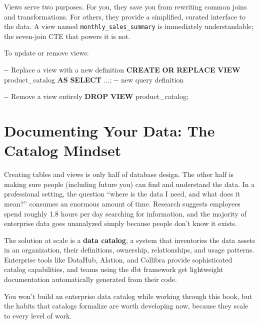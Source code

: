 \documentclass[
  letterpaper,
  DIV=11,
  numbers=noendperiod]{scrreprt}
\newenvironment{Shaded}{\begin{snugshade}}{\end{snugshade}}
\newcommand{\CommentTok}[1]{\textcolor[rgb]{0.37,0.37,0.37}{#1}}
\newcommand{\KeywordTok}[1]{\textcolor[rgb]{0.00,0.23,0.31}{\textbf{#1}}}
\newcommand{\NormalTok}[1]{\textcolor[rgb]{0.00,0.23,0.31}{#1}}
\newcommand{\OperatorTok}[1]{\textcolor[rgb]{0.37,0.37,0.37}{#1}}
\begin{document}
Views serve two purposes. For you, they save you from rewriting common
joins and transformations. For others, they provide a simplified,
curated interface to the data. A view named
\texttt{monthly\_sales\_summary} is immediately understandable; the
seven-join CTE that powers it is not.

To update or remove views:

\begin{codelisting}

\caption{\texttt{duckdb}}

\begin{Shaded}
\begin{Highlighting}[]
\CommentTok{{-}{-} Replace a view with a new definition}
\KeywordTok{CREATE} \KeywordTok{OR} \KeywordTok{REPLACE} \KeywordTok{VIEW}\NormalTok{ product\_catalog }\KeywordTok{AS}
\KeywordTok{SELECT} \OperatorTok{..}\NormalTok{.;  }\CommentTok{{-}{-} new query definition}

\CommentTok{{-}{-} Remove a view entirely}
\KeywordTok{DROP} \KeywordTok{VIEW}\NormalTok{ product\_catalog;}
\end{Highlighting}
\end{Shaded}

\end{codelisting}

\section{Documenting Your Data: The Catalog
Mindset}\label{documenting-your-data-the-catalog-mindset}

Creating tables and views is only half of database design. The other
half is making sure people (including future you) can find and
understand the data. In a professional setting, the question ``where is
the data I need, and what does it mean?'' consumes an enormous amount of
time. Research suggests employees spend roughly 1.8 hours per day
searching for information, and the majority of enterprise data goes
unanalyzed simply because people don't know it exists.

The solution at scale is a \textbf{data catalog}, a system that
inventories the data assets in an organization, their definitions,
ownership, relationships, and usage patterns. Enterprise tools like
DataHub, Alation, and Collibra provide sophisticated catalog
capabilities, and teams using the dbt framework get lightweight
documentation automatically generated from their code.

You won't build an enterprise data catalog while working through this
book, but the habits that catalogs formalize are worth developing now,
because they scale to every level of work.
\end{document}
